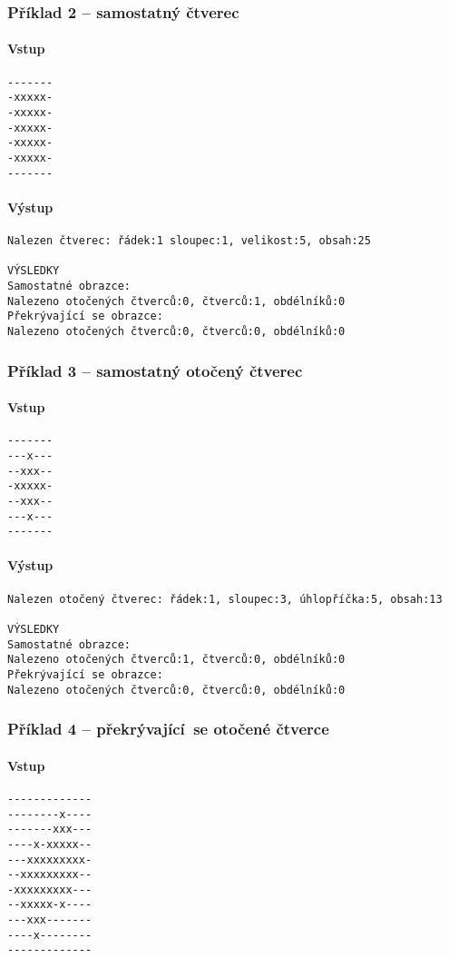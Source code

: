 \documentclass[12pt]{article}
\begin{document}
\subsubsection{Příklad 2 -- samostatný čtverec}

\paragraph{Vstup}
\begin{verbatim}
-------
-xxxxx-
-xxxxx-
-xxxxx-
-xxxxx-
-xxxxx-
-------
\end{verbatim}
\paragraph{Výstup}
\begin{verbatim}
Nalezen čtverec: řádek:1 sloupec:1, velikost:5, obsah:25 

VÝSLEDKY
Samostatné obrazce:
Nalezeno otočených čtverců:0, čtverců:1, obdélníků:0
Překrývající se obrazce:
Nalezeno otočených čtverců:0, čtverců:0, obdélníků:0
\end{verbatim}

\subsubsection{Příklad 3 -- samostatný otočený čtverec}
\paragraph{Vstup}
\begin{verbatim}
-------
---x---
--xxx--
-xxxxx-
--xxx--
---x---
-------
\end{verbatim}
\paragraph{Výstup}
\begin{verbatim}
Nalezen otočený čtverec: řádek:1, sloupec:3, úhlopříčka:5, obsah:13

VÝSLEDKY
Samostatné obrazce:
Nalezeno otočených čtverců:1, čtverců:0, obdélníků:0
Překrývající se obrazce:
Nalezeno otočených čtverců:0, čtverců:0, obdélníků:0
\end{verbatim}

\subsubsection{Příklad 4 -- překrývající~se otočené čtverce}
\paragraph{Vstup}
\begin{verbatim}
-------------
--------x----
-------xxx---
----x-xxxxx--
---xxxxxxxxx-
--xxxxxxxxx--
-xxxxxxxxx---
--xxxxx-x----
---xxx-------
----x--------
-------------
\end{verbatim}
\end{document}
